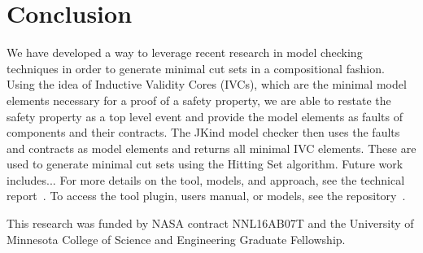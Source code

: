 \section{Conclusion}

We have developed a way to leverage recent research in model checking techniques in order to generate minimal cut sets in a compositional fashion. Using the idea of Inductive Validity Cores (IVCs), which are the minimal model elements necessary for a proof of a safety property, we are able to restate the safety property as a top level event and provide the model elements as faults of components and their contracts. The JKind model checker then uses the faults and contracts as model elements and returns all minimal IVC elements. These are used to generate minimal cut sets using the Hitting Set algorithm. Future work includes...  For more details on the tool, models, and approach, see the technical report~\cite{SATechReport}. To access the tool plugin, users manual, or models, see the repository~\cite{SAGithub}. 

\vspace{2 mm}
 This research was funded by NASA contract NNL16AB07T and the University of Minnesota College of Science and Engineering Graduate Fellowship.


